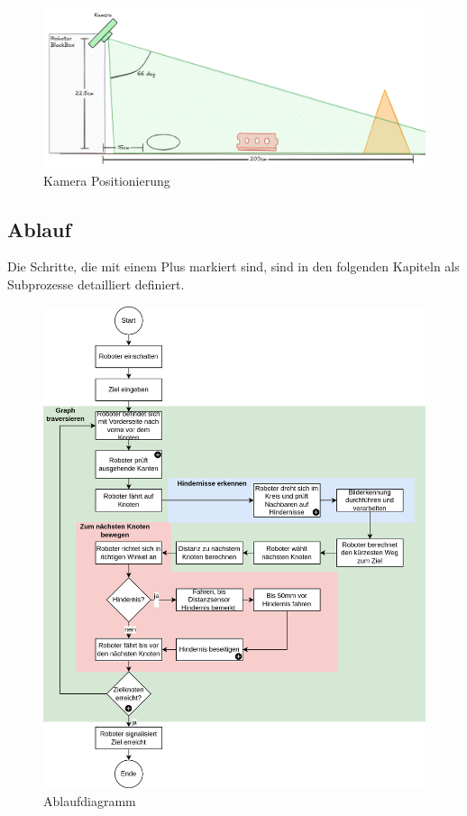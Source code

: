 \begin{figure}[H]
    \centering
    \includegraphics[width=1\linewidth]{assets//informatik-prototyp//camera/camera_position.png}
    \caption{Kamera Positionierung}
    \label{fig:camera-position-concept}
\end{figure}



\subsection{Ablauf}

Die Schritte, die mit einem Plus markiert sind, sind in den folgenden Kapiteln als Subprozesse detailliert definiert.

\begin{figure}[H]
\centering
\includegraphics[width=\textwidth]{assets/gesamtkonzept/ablaufdiagramm.png}
\caption{Ablaufdiagramm}
\label{fig:ablaufdiagramm}
\end{figure}





